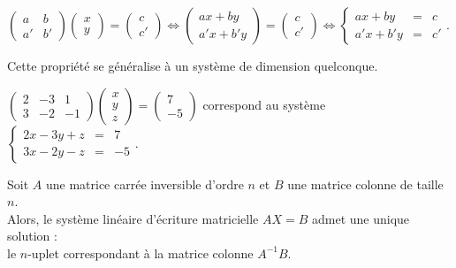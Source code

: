 \documentclass{cornouaille}
\begin{document}
\begin{preuve}
$\begin{pmatrix}
 a & b \\
 a' & b'\end{pmatrix}\begin{pmatrix}
 x  \\
y \end{pmatrix}=\begin{pmatrix}
 c  \\
c' \end{pmatrix}
\Leftrightarrow
\begin{pmatrix}
 ax+by \\
 a'x+b'y\end{pmatrix}
=\begin{pmatrix}
 c  \\
c' \end{pmatrix}
\Leftrightarrow
\left\{\begin{array}{ccc}
ax+by & = & c\\
a'x+b'y & = & c'
\end{array}\right.$.
\end{preuve}

\begin{remarque}
Cette propriété se généralise à un système  de dimension quelconque.
\end{remarque}




\begin{exemple}
$\begin{pmatrix}
 2 & -3 & 1 \\
 3 & -2 & -1 \end{pmatrix}\begin{pmatrix}
 x  \\
y \\
z \end{pmatrix}=\begin{pmatrix}
 7  \\
-5 \end{pmatrix}$ correspond au système
$\left\{\begin{array}{ccc}
2x-3y+z & = & 7\\
3x-2y-z & = & -5
\end{array}\right.$.
\end{exemple}


\begin{propriete}
Soit $A$ une matrice carrée inversible d'ordre $n$ et $B$ une matrice colonne de taille $n$.\\
Alors, le système linéaire d'écriture matricielle $AX=B$ admet une unique solution :\\
le $n$-uplet  correspondant à la matrice colonne $A^{-1}B$.
\end{propriete}
\end{document}
